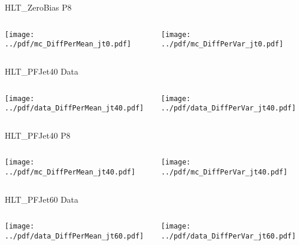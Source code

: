 \documentclass[9pt]{beamer}
\begin{document}
\begin{frame}[t]{HLT\_ZeroBias P8}
\begin{columns}[T]
  \begin{column}{.5\textwidth}
  \texttt{[image: ../pdf/mc\_DiffPerMean\_jt0.pdf]}
  \end{column}
  \begin{column}{.5\textwidth}
  \texttt{[image: ../pdf/mc\_DiffPerVar\_jt0.pdf]}
  \end{column}
\end{columns}
\end{frame}

\begin{frame}[t]{HLT\_PFJet40 Data}
\begin{columns}[T]
  \begin{column}{.5\textwidth}
  \texttt{[image: ../pdf/data\_DiffPerMean\_jt40.pdf]}
  \end{column}
  \begin{column}{.5\textwidth}
  \texttt{[image: ../pdf/data\_DiffPerVar\_jt40.pdf]}
  \end{column}
\end{columns}
\end{frame}

\begin{frame}[t]{HLT\_PFJet40 P8}
\begin{columns}[T]
  \begin{column}{.5\textwidth}
  \texttt{[image: ../pdf/mc\_DiffPerMean\_jt40.pdf]}
  \end{column}
  \begin{column}{.5\textwidth}
  \texttt{[image: ../pdf/mc\_DiffPerVar\_jt40.pdf]}
  \end{column}
\end{columns}
\end{frame}

\begin{frame}[t]{HLT\_PFJet60 Data}
\begin{columns}[T]
  \begin{column}{.5\textwidth}
  \texttt{[image: ../pdf/data\_DiffPerMean\_jt60.pdf]}
  \end{column}
  \begin{column}{.5\textwidth}
  \texttt{[image: ../pdf/data\_DiffPerVar\_jt60.pdf]}
  \end{column}
\end{columns}
\end{frame}
\end{document}
